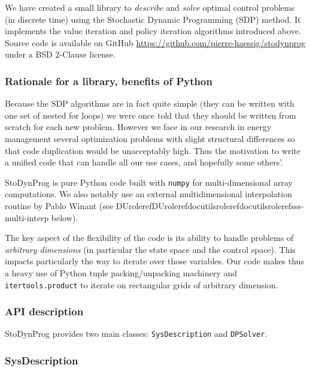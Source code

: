 \documentclass[letterpaper,compsoc,twoside]{IEEEtran}
\providecommand*{\DUrole}[2]{\ifcsname DUrole#1\endcsname \csname DUrole#1\endcsname{#2}\else \ifcsname docutilsrole#1\endcsname \csname docutilsrole#1\endcsname{#2}\else #2\fi \fi }
\begin{document}
We have created a small library to \emph{describe}
and \emph{solve} optimal control problems (in discrete time) using the Stochastic
Dynamic Programming (SDP) method. It implements the value iteration and
policy iteration algorithms introduced above.
Source code is available on GitHub \url{https://github.com/pierre-haessig/stodynprog}
under a BSD 2-Clause license.

\subsubsection{Rationale for a library, benefits of Python\label{rationale-for-a-library-benefits-of-python}}


Because the SDP algorithms are in fact quite simple (they can be written
with one set of nested for loops) we were once told that they should be
written from scratch for each new problem. However we face in our
research in energy management several optimization problems with slight
structural differences so that code duplication would be
unacceptably high. Thus the motivation to write a unified code that can
handle all our use cases, and hopefully some others’.

StoDynProg is pure Python code built with \texttt{numpy} for
multi-dimensional array computations. We also notably use an external
multidimensional interpolation routine by Pablo Winant (see
\DUrole{ref}{sss-multi-interp} below).

The key aspect of the flexibility of the code is its ability to handle
problems of \emph{arbitrary dimensions} (in particular the state space and
the control space). This impacts particularly the way to iterate over
those variables. Our code makes thus a heavy use of Python tuple
packing/unpacking machinery and \texttt{itertools.product} to iterate on
rectangular grids of arbitrary dimension.

\subsubsection{API description\label{api-description}}


StoDynProg provides two main classes: \texttt{SysDescription} and
\texttt{DPSolver}.

\subsubsection{SysDescription\label{sysdescription}}
\end{document}
